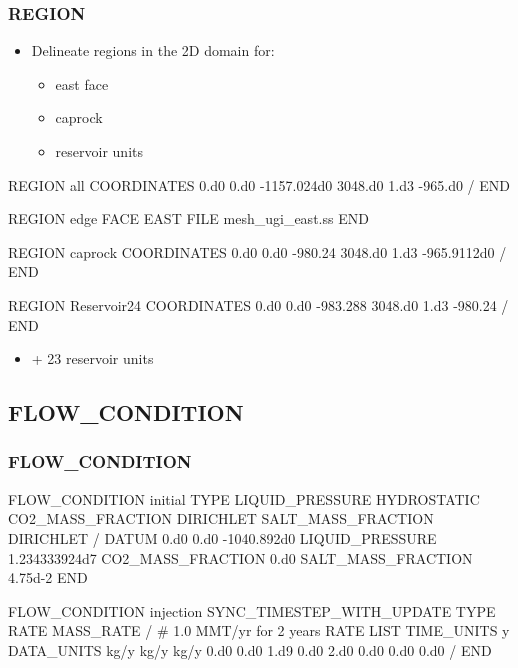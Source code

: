\documentclass{beamer}
\begin{document}
\begin{frame}\frametitle{REGION}

\begin{itemize}
  \item Delineate regions in the 2D domain for:
  \begin{itemize}
    \item east face
    \item caprock
    \item reservoir units
  \end{itemize}
\end{itemize}

\begin{semiverbatim}
REGION all
  COORDINATES
    0.d0    0.d0 -1157.024d0
    3048.d0 1.d3 -965.d0
  /
END
\newpage

REGION edge
  FACE EAST
  FILE mesh_ugi_east.ss
END

\newpage
REGION caprock
  COORDINATES
    0.d0    0.d0 -980.24
    3048.d0 1.d3 -965.9112d0
  /
END

REGION Reservoir24
  COORDINATES
    0.d0    0.d0 -983.288
    3048.d0 1.d3 -980.24
  /
END
\end{semiverbatim}

\begin{itemize}
  \item + 23 reservoir units
\end{itemize}

\end{frame}

\subsection{FLOW\_CONDITION}

\begin{frame}\frametitle{FLOW\_CONDITION}

\begin{semiverbatim}
FLOW_CONDITION initial
  TYPE
    LIQUID_PRESSURE HYDROSTATIC
    CO2_MASS_FRACTION DIRICHLET
    SALT_MASS_FRACTION DIRICHLET
  /
  DATUM 0.d0 0.d0 -1040.892d0
  LIQUID_PRESSURE 1.234333924d7
  CO2_MASS_FRACTION 0.d0
  SALT_MASS_FRACTION 4.75d-2
END

\newpage
FLOW_CONDITION injection
  SYNC_TIMESTEP_WITH_UPDATE
  TYPE
    RATE MASS_RATE
  /
  # 1.0 MMT/yr for 2 years
  RATE LIST
    TIME_UNITS y
    DATA_UNITS kg/y kg/y kg/y
    0.d0 0.d0 1.d9 0.d0
    2.d0 0.d0 0.d0 0.d0
  /
END
\end{semiverbatim}

\end{frame}
\end{document}
